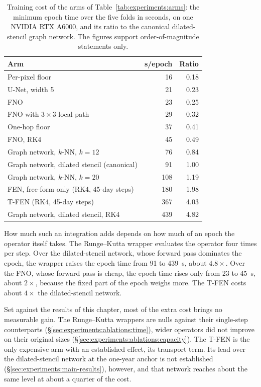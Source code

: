 \begin{table}[h]
  \centering
  \caption[Training cost of the arms.]{%
    Training cost of the arms of Table~\ref{tab:experiments:arms}: the
    minimum epoch time over the five folds in seconds, on one NVIDIA RTX
    A6000, and its ratio to the canonical dilated-stencil graph network.
    The figures support order-of-magnitude statements only.}
  \label{tab:experiments:cost}
  \small
  \begin{tabular}{l r r}
    \toprule
    Arm & s/epoch & Ratio \\
    \midrule
    Per-pixel floor & 16 & 0.18 \\
    U-Net, width 5 & 21 & 0.23 \\
    FNO & 23 & 0.25 \\
    FNO with $3 \times 3$ local path & 29 & 0.32 \\
    One-hop floor & 37 & 0.41 \\
    FNO, RK4 & 45 & 0.49 \\
    Graph network, $k$-NN, $k = 12$ & 76 & 0.84 \\
    Graph network, dilated stencil (canonical) & 91 & 1.00 \\
    Graph network, $k$-NN, $k = 20$ & 108 & 1.19 \\
    FEN, free-form only (RK4, 45-day steps) & 180 & 1.98 \\
    T-FEN (RK4, 45-day steps) & 367 & 4.03 \\
    Graph network, dilated stencil, RK4 & 439 & 4.82 \\
    \bottomrule
  \end{tabular}
\end{table}

How much such an integration adds depends on how much of an epoch the
operator itself takes. The Runge--Kutta wrapper evaluates the operator four
times per step. Over the dilated-stencil network, whose forward pass
dominates the epoch, the wrapper raises the epoch time from 91 to 439~s,
about $4.8\times$. Over the FNO, whose forward pass is cheap, the epoch time
rises only from 23 to 45~s, about $2\times$, because the fixed part of the
epoch weighs more. The T-FEN costs about $4\times$ the dilated-stencil
network.

Set against the results of this chapter, most of the extra cost brings no
measurable gain. The Runge--Kutta wrappers are nulls against their
single-step counterparts (\S\ref{sec:experiments:ablations:time}), wider
operators did not improve on their original sizes
(\S\ref{sec:experiments:ablations:capacity}). The T-FEN is the only expensive arm with an
established effect, its transport term. Its lead over the dilated-stencil
network at the one-year anchor is not established
(\S\ref{sec:experiments:main-results}), however, and that network reaches
about the same level at about a quarter of the cost.

